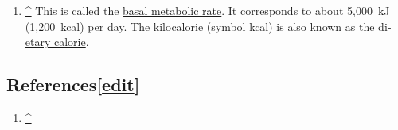 \documentclass[
]{article}
\providecommand{\tightlist}{%
  \setlength{\itemsep}{0pt}\setlength{\parskip}{0pt}}
\newenvironment{LTR}{\beginL}{\endL}
\begin{document}
\begin{LTR}
\begin{otherlanguage}{english}
\begin{enumerate}
\tightlist
\item
  \label{cite_note-11}{{\textbf{\hyperref[cite_ref-11]{\^{}}}}
  {This is called the \href{/wiki/Basal_metabolic_rate}{basal metabolic
  rate}. It corresponds to about 5,000~kJ (1,200~kcal) per day. The
  kilocalorie (symbol kcal) is also known as the
  \href{/wiki/Calorie}{dietary calorie}. }}
\end{enumerate}

\subsection[{{{[}}\href{/w/index.php?title=Joule&action=edit&section=9}{{edit}}{{]}}}]{\texorpdfstring{\label{References}{References}{{{[}}\href{/w/index.php?title=Joule&action=edit&section=9}{{edit}}{{]}}}}{References{[}edit{]}}}\label{referencesedit}

\begin{enumerate}
\tightlist
\item
  \label{cite_note-1}{{\textbf{\hyperref[cite_ref-1]{\^{}}}}
  {}}


\end{enumerate}
\end{otherlanguage}
\end{LTR}
\end{document}
